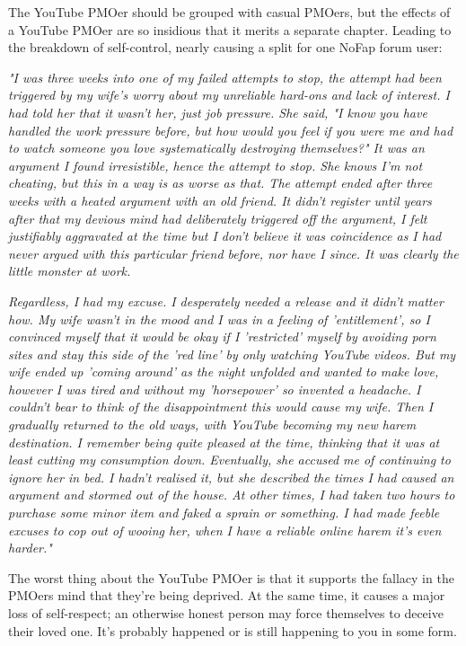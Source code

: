 \documentclass[easypeasy.tex]{subfiles}
\begin{document}
The YouTube PMOer should be grouped with casual PMOers, but the effects of a YouTube PMOer are so insidious that it merits a separate chapter. Leading to the breakdown of self-control, nearly causing a split for one NoFap forum user:

\textit{"I was three weeks into one of my failed attempts to stop, the attempt had been triggered by my wife's worry about my unreliable hard-ons and lack of interest. I had told her that it wasn't her, just job pressure. She said, "I know you have handled the work pressure before, but how would you feel if you were me and had to watch someone you love systematically destroying themselves?" It was an argument I found irresistible, hence the attempt to stop. She knows I'm not cheating, but this in a way is as worse as that. The attempt ended after three weeks with a heated argument with an old friend. It didn't register until years after that my devious mind had deliberately triggered off the argument, I felt justifiably aggravated at the time but I don't believe it was coincidence as I had never argued with this particular friend before, nor have I since. It was clearly the little monster at work.}

\textit{Regardless, I had my excuse. I desperately needed a release and it didn't matter how. My wife wasn't in the mood and I was in a feeling of 'entitlement', so I convinced myself that it would be okay if I 'restricted' myself by avoiding porn sites and stay this side of the 'red line' by only watching YouTube videos. But my wife ended up 'coming around' as the night unfolded and wanted to make love, however I was tired and without my 'horsepower' so invented a headache. I couldn't bear to think of the disappointment this would cause my wife. Then I gradually returned to the old ways, with YouTube becoming my new harem destination. I remember being quite pleased at the time, thinking that it was at least cutting my consumption down. Eventually, she accused me of continuing to ignore her in bed. I hadn't realised it, but she described the times I had caused an argument and stormed out of the house. At other times, I had taken two hours to purchase some minor item and faked a sprain or something. I had made feeble excuses to cop out of wooing her, when I have a reliable online harem it's even harder."}

The worst thing about the YouTube PMOer is that it supports the fallacy in the PMOers mind that they're being deprived. At the same time, it causes a major loss of self-respect; an otherwise honest person may force themselves to deceive their loved one. It's probably happened or is still happening to you in some form.
\end{document}

